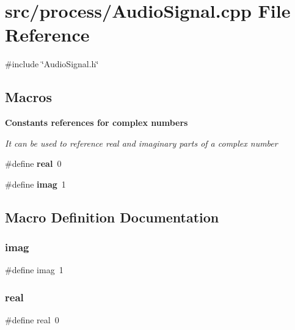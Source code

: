\section{src/process/\+Audio\+Signal.cpp File Reference}
\label{_audio_signal_8cpp}
{\ttfamily \#include \char`\"{}Audio\+Signal.\+h\char`\"{}}\newline
\subsection*{Macros}
\begin{Indent}\textbf{ Constants references for complex numbers}\par
{\em It can be used to reference real and imaginary parts of a complex number }\begin{DoxyCompactItemize}
\item 
\#define \textbf{ real}~0
\item 
\#define \textbf{ imag}~1
\end{DoxyCompactItemize}
\end{Indent}


\subsection{Macro Definition Documentation}
\mbox{\label{_audio_signal_8cpp_a06ebc6bb2d8547759c483e78d2087c51}} 
\subsubsection{imag}
{\footnotesize\ttfamily \#define imag~1}

\mbox{\label{_audio_signal_8cpp_a5f5a64ef503db0fc824df8320929b126}} 
\subsubsection{real}
{\footnotesize\ttfamily \#define real~0}

